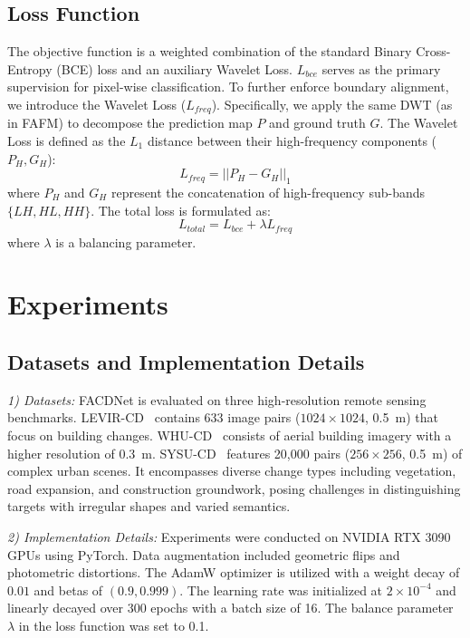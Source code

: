 \documentclass[lettersize,journal]{IEEEtran}
\begin{document}
\vspace{-10pt}
\subsection{Loss Function}
The objective function is a weighted combination of the standard Binary Cross-Entropy (BCE) loss and an auxiliary Wavelet Loss. $L_{bce}$ serves as the primary supervision for pixel-wise classification. To further enforce boundary alignment, we introduce the Wavelet Loss ($L_{freq}$). Specifically, we apply the same DWT (as in FAFM) to decompose the prediction map $P$ and ground truth $G$. The Wavelet Loss is defined as the $L_1$ distance between their high-frequency components ($P_{H}, G_{H}$):
\begin{equation}
\label{deqn_Lfreq}
L_{freq} = || P_{H} - G_{H} ||_1
\end{equation}
where $P_{H}$ and $G_{H}$ represent the concatenation of high-frequency sub-bands $\{LH, HL, HH\}$. The total loss is formulated as:
\begin{equation}
\label{deqn_Ltotal}
L_{total} = L_{bce} + \lambda L_{freq}
\end{equation}
where $\lambda$ is a balancing parameter.

\vspace{-5pt}

\section{Experiments} 

\subsection{Datasets and Implementation Details}
\textit{1) Datasets:} FACDNet is evaluated on three high-resolution remote sensing benchmarks. LEVIR-CD~\cite{chen2020spatial} contains 633 image pairs ($1024 \times 1024$, 0.5~m) that focus on building changes. WHU-CD~\cite{ji2018fully} consists of aerial building imagery with a higher resolution of 0.3~m. SYSU-CD~\cite{shi2021deeply} features 20,000 pairs ($256 \times 256$, 0.5~m) of complex urban scenes. It encompasses diverse change types including vegetation, road expansion, and construction groundwork, posing challenges in distinguishing targets with irregular shapes and varied semantics.

\textit{2) Implementation Details:} Experiments were conducted on NVIDIA RTX 3090 GPUs using PyTorch. Data augmentation included geometric flips and photometric distortions. The AdamW optimizer is utilized with a weight decay of $0.01$ and betas of $(0.9, 0.999)$. The learning rate was initialized at $2 \times 10^{-4}$ and linearly decayed over 300 epochs with a batch size of 16. The balance parameter $\lambda$ in the loss function was set to 0.1.
\end{document}
